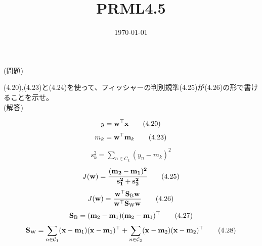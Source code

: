 \documentclass{jsarticle}
\title{PRML4.5}
\date{\today}
\begin{document}
\maketitle

(問題)

(4.20),(4.23)と(4.24)を使って、フィッシャーの判別規準(4.25)が(4.26)の形で書けることを示せ。
\\ 

(解答)

\begin{align*}
    y={\bf w}^\top{\bf x} \tag{4.20}
\end{align*}
\begin{align*}
    m_k={\bf w}^\top{\bf m}_k\tag{4.23}
    \end{align*}
\begin{align*}
    s_k^2 = \sum_{n \in C_k} (y_n - m_k)^2 \tag{4.24}
\end{align*}
\begin{align*}
    J(\bf w) = \cfrac{(m_2 - m_1)^2}{s_1^2 + s_2^2} \tag{4.25}
\end{align*}
\begin{align*}
    J({\bf w})=\frac{{\bf w}^\top{\bf S}_{\rm B}{\bf w}}{{\bf w}^\top{\bf S}_{\rm W}{\bf w}}\tag{4.26}
    \end{align*}
\begin{align*}
    {\bf S}_{\rm B}=({\bf m}_2-{\bf m}_1)({\bf m}_2-{\bf m}_1)^\top\tag{4.27}
    \end{align*}
\begin{align*}
    {\bf S}_{\rm W}=\sum_{n\in{\mathcal C}_1}({\bf x}-{\bf m}_1)({\bf x}-{\bf m}_1)^\top+\sum_{n\in{\mathcal C}_2}({\bf x}-{\bf m}_2)({\bf x}-{\bf m}_2)^\top\tag{4.28}
    \end{align*}
\end{document}
